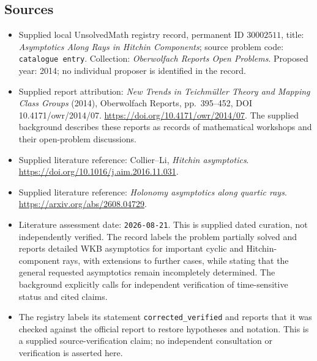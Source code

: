 \documentclass[11pt]{article}
\begin{document}
\subsection{Sources}
\begin{itemize}
\item Supplied local UnsolvedMath registry record, permanent ID \(30002511\), title: \emph{Asymptotics Along Rays in Hitchin Components}; source problem code: \texttt{catalogue entry}. Collection: \emph{Oberwolfach Reports Open Problems}. Proposed year: 2014; no individual proposer is identified in the record.
\item Supplied report attribution: \emph{New Trends in Teichm\"uller Theory and Mapping Class Groups} (2014), Oberwolfach Reports, pp.\ 395--452, DOI 10.4171/owr/2014/07. \url{https://doi.org/10.4171/owr/2014/07}. The supplied background describes these reports as records of mathematical workshops and their open-problem discussions.
\item Supplied literature reference: Collier--Li, \emph{Hitchin asymptotics}. \url{https://doi.org/10.1016/j.aim.2016.11.031}.
\item Supplied literature reference: \emph{Holonomy asymptotics along quartic rays}. \url{https://arxiv.org/abs/2608.04729}.
\item Literature assessment date: \texttt{2026-08-21}. This is supplied dated curation, not independently verified. The record labels the problem partially solved and reports detailed WKB asymptotics for important cyclic and Hitchin-component rays, with extensions to further cases, while stating that the general requested asymptotics remain incompletely determined. The background explicitly calls for independent verification of time-sensitive status and cited claims.
\item The registry labels its statement \texttt{corrected\_verified} and reports that it was checked against the official report to restore hypotheses and notation. This is a supplied source-verification claim; no independent consultation or verification is asserted here.
\end{itemize}
\end{document}
